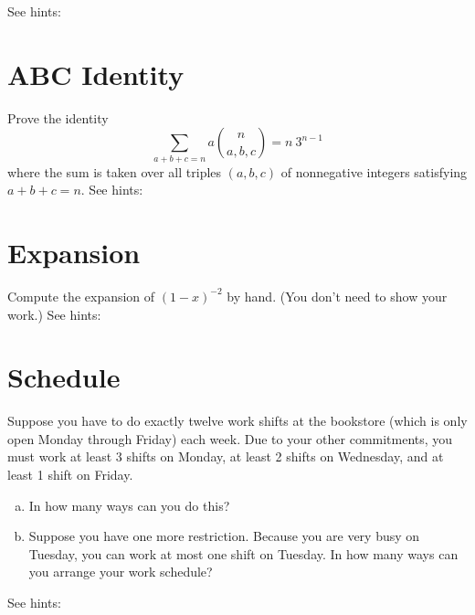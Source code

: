 \documentclass[12pt]{amsart}
\begin{document}
See hints: 





\section{ABC Identity}
Prove the identity 
\[
\sum_{a+b+c=n} a {n \choose a,b,c} = n ~ 3^{n-1}
\]
where the sum is taken over all triples $(a,b,c)$ of nonnegative integers satisfying $a+b+c=n$. 
See hints:



\section{Expansion}
Compute the expansion of $(1-x)^{-2}$ by hand. 
(You don't need to show your work.) 
See hints:


\section{Schedule}
Suppose you have to do exactly twelve work shifts at the bookstore (which is only open Monday through Friday) each week. 
Due to your other commitments, you must work 
at least 3 shifts on Monday, 
at least 2 shifts on Wednesday, and 
at least 1 shift on Friday.

\begin{enumerate}[a.]
    \item In how many ways can you do this?
    \item Suppose you have one more restriction. Because you are very busy on Tuesday, you can work at most one shift on Tuesday. In how many ways can you arrange your work schedule? 
\end{enumerate}

See hints:
\end{document}
